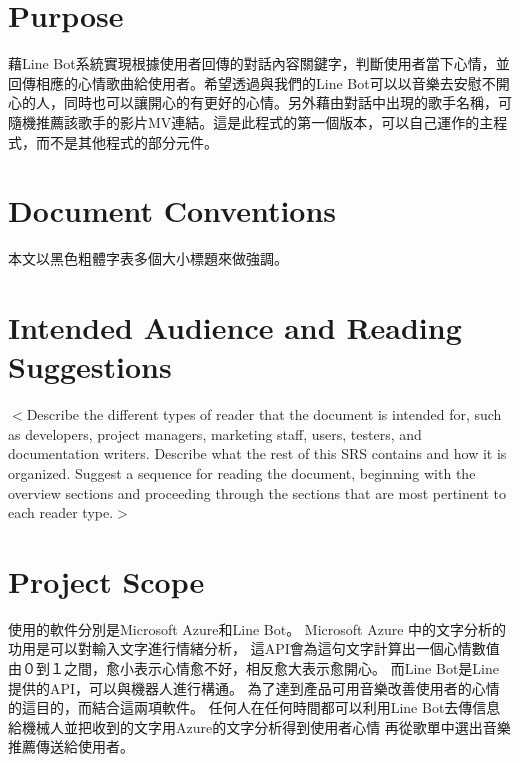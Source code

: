 \documentclass{scrreprt}
\begin{document}
\section{Purpose}
\begin{CJK}{UTF8}{<font>}
        藉Line Bot系統實現根據使用者回傳的對話內容關鍵字，判斷使用者當下心情，並回傳相應的心情歌曲給使用者。希望透過與我們的Line Bot可以以音樂去安慰不開心的人，同時也可以讓開心的有更好的心情。另外藉由對話中出現的歌手名稱，可隨機推薦該歌手的影片MV連結。這是此程式的第一個版本，可以自己運作的主程式，而不是其他程式的部分元件。
\end{CJK}

\section{Document Conventions}
\begin{CJK}{UTF8}{<font>}
 本文以黑色粗體字表多個大小標題來做強調。
\end{CJK}

\section{Intended Audience and Reading Suggestions}
\begin{CJK}{UTF8}{<font>}
       $<$Describe the different types of reader that the document is intended for, 
such as developers, project managers, marketing staff, users, testers, and 
documentation writers. Describe what the rest of this SRS contains and how it is 
organized. Suggest a sequence for reading the document, beginning with the 
overview sections and proceeding through the sections that are most pertinent to 
each reader type.$>$
\end{CJK}

\section{Project Scope}
\begin{CJK}{UTF8}{<font>}
        使用的軟件分別是Microsoft Azure和Line Bot。
Microsoft Azure 中的文字分析的功用是可以對輸入文字進行情緒分析，
這API會為這句文字計算出一個心情數值由０到１之間，愈小表示心情愈不好，相反愈大表示愈開心。
而Line Bot是Line提供的API，可以與機器人進行構通。
為了達到產品可用音樂改善使用者的心情的這目的，而結合這兩項軟件。
任何人在任何時間都可以利用Line Bot去傳信息給機械人並把收到的文字用Azure的文字分析得到使用者心情
再從歌單中選出音樂推薦傳送給使用者。
\end{CJK}
\end{document}
